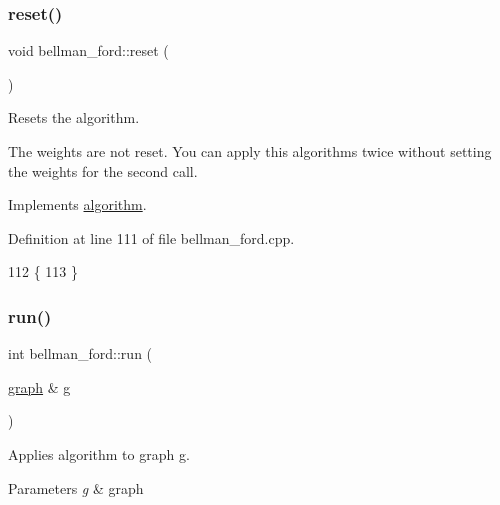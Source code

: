 \mbox{\label{classbellman__ford_a7d28afa62ce8068c4d0f2d1f96136fd6}} 
\subsubsection{\texorpdfstring{reset()}{reset()}}
{\footnotesize\ttfamily void bellman\+\_\+ford\+::reset (\begin{DoxyParamCaption}{ }\end{DoxyParamCaption})\hspace{0.3cm}{\ttfamily [virtual]}}



Resets the algorithm. 

The weights are not reset. You can apply this algorithms twice without setting the weights for the second call. 

Implements \mbox{\hyperlink{classalgorithm_a21aba63d066ae7897de6ca7d8425c408}{algorithm}}.



Definition at line 111 of file bellman\+\_\+ford.\+cpp.


\begin{DoxyCode}
112 \{
113 \}
\end{DoxyCode}
\mbox{\label{classbellman__ford_a226308389f3c36dfc02768c09f777a3b}} 
\subsubsection{\texorpdfstring{run()}{run()}}
{\footnotesize\ttfamily int bellman\+\_\+ford\+::run (\begin{DoxyParamCaption}\item[{\mbox{\hyperlink{classgraph}{graph}} \&}]{g }\end{DoxyParamCaption})\hspace{0.3cm}{\ttfamily [virtual]}}



Applies algorithm to graph g. 


\begin{DoxyParams}{Parameters}
{\em g} & graph \\
\hline
\end{DoxyParams}

